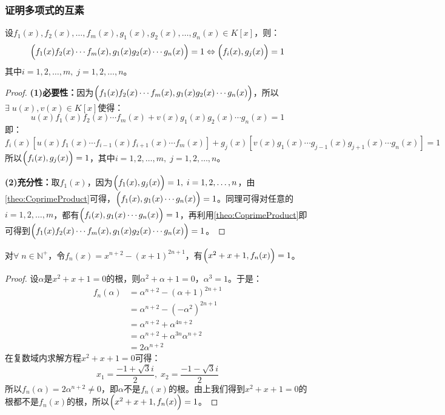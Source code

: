 \subsubsection{证明多项式的互素}
\begin{theorem}
	设$f_1(x),f_2(x),\dots,f_m(x),g_1(x),g_2(x),\dots,g_n(x)\in K[x]$，则：
	\begin{equation*}
		\Bigl(f_1(x)f_2(x)\cdots f_m(x),g_1(x)g_2(x)\cdots g_n(x)\Bigr)=1\Leftrightarrow\Bigl(f_i(x),g_j(x)\Bigr)=1
	\end{equation*}
	其中$i=1,2,\dots,m,\;j=1,2,\dots,n$。
\end{theorem}
\begin{proof}
	\textbf{(1)必要性：}因为$\Bigl(f_1(x)f_2(x)\cdots f_m(x),g_1(x)g_2(x)\cdots g_n(x)\Bigr)$，所以$\exists\;u(x),v(x)\in K[x]$使得：
	\begin{equation*}
		u(x)f_1(x)f_2(x)\cdots f_m(x)+v(x)g_1(x)g_2(x)\cdots g_n(x)=1
	\end{equation*}
	即：
	\begin{equation*}
		f_i(x)[u(x)f_1(x)\cdots f_{i-1}(x)f_{i+1}(x)\cdots f_m(x)]+g_j(x)[v(x)g_1(x)\cdots g_{j-1}(x)g_{j+1}(x)\cdots g_n(x)]=1
	\end{equation*}
	所以$\Bigl(f_i(x),g_j(x)\Bigr)=1$，其中$i=1,2,\dots,m,\;j=1,2,\dots,n$。\par
	\textbf{(2)充分性：}取$f_1(x)$，因为$\Bigl(f_1(x),g_j(x)\Bigr)=1,\;i=1,2,\dots,n$，由\cref{theo:CoprimeProduct}可得，$\Bigl(f_1(x),g_1(x)\cdots g_n(x)\Bigr)=1$。同理可得对任意的$i=1,2,\dots,m$，都有$\Bigl(f_i(x),g_1(x)\cdots g_n(x)\Bigr)=1$，再利用\cref{theo:CoprimeProduct}即可得到$\Bigl(f_1(x)f_2(x)\cdots f_m(x),g_1(x)g_2(x)\cdots g_n(x)\Bigr)=1$。
\end{proof}
\begin{theorem}
	对$\forall\;n\in\mathbb{N}^+$，令$f_n(x)=x^{n+2}-(x+1)^{2n+1}$，有$\Bigl(x^2+x+1,f_n(x)\Bigr)=1$。
\end{theorem}
\begin{proof}
	设$\alpha$是$x^2+x+1=0$的根，则$\alpha^2+\alpha+1=0$，$\alpha^3=1$。于是：
	\begin{align*}
		f_n(\alpha)
		&=\alpha^{n+2}-(\alpha+1)^{2n+1} \\
		&=\alpha^{n+2}-(-\alpha^2)^{2n+1} \\
		&=\alpha^{n+2}+\alpha^{4n+2} \\
		&=\alpha^{n+2}+\alpha^{3n}\alpha^{n+2} \\
		&=2\alpha^{n+2}
	\end{align*}
	在复数域内求解方程$x^2+x+1=0$可得：
	\begin{equation*}
		x_1=\frac{-1+\sqrt{3}i}{2},\;x_2=\frac{-1-\sqrt{3}i}{2}
	\end{equation*}
	所以$f_n(\alpha)=2\alpha^{n+2}\ne0$，即$\alpha$不是$f_n(x)$的根。由上我们得到$x^2+x+1=0$的根都不是$f_n(x)$的根，所以$\Bigl(x^2+x+1,f_n(x)\Bigr)=1$。
\end{proof}
